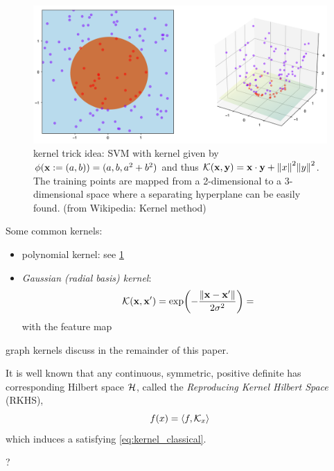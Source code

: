 \begin{figure}[!ht]
	\centering
	\includegraphics[width=0.6\linewidth]{Kernel_trick_idea.png}
	\caption{kernel trick idea: SVM with kernel given by $\phi(\vb{x}:=(a, b)) = (a, b, a^2 + b^2)$ and thus $\mathcal{K}(\vb{x},\vb{y})=\vb{x}\cdot \vb{y}+\norm{x}^2 \norm{y}^2$. The training points are mapped from a 2-dimensional to a 3-dimensional space where a separating hyperplane can be easily found. (from Wikipedia: Kernel method)}
	\label{fig:kernel}
\end{figure}
Some common kernels: 
\begin{itemize}
	\item polynomial kernel:
	see \cref{fig:kernel}

	\item \emph{Gaussian (radial basis) kernel}:
	\begin{equation}
		\mathcal{K}(\vb{x},\vb{x}') = 
		\exp(-\frac{\norm{\vb{x}-\vb{x}'}}{2\sigma^2})
		=
	\end{equation}
	with the feature map
\end{itemize}
graph kernels discuss in the remainder of this paper.

\begin{definition}
	It is well known that any continuous, symmetric, positive definite  has corresponding Hilbert space $\mathcal{H}$, called the \emph{Reproducing Kernel Hilbert Space} (RKHS),
	\begin{equation}
		f(x) = \expval{f,\mathcal{K}_x}
	\end{equation}
	which induces a 
	satisfying \cref{eq:kernel_classical}.
\end{definition}
\begin{theorem}
	?
\end{theorem}

